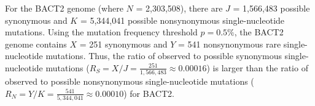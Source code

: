 For the BACT2 genome
(where $N$ = 2,303,508),
there are $J$ = 1,566,483 possible synonymous and
$K$ = 5,344,041 possible nonsynonymous single-nucleotide mutations.
%
Using the mutation frequency threshold $p = 0.5\%$,
the BACT2 genome contains
$X$ = 251 synonymous and
$Y$ = 541 nonsynonymous rare single-nucleotide mutations.
%
Thus, the ratio of observed to possible synonymous single-nucleotide mutations
($R_S = X / J = \frac{251}{1,566,483}
\approx 0.00016$)
is larger than the ratio of observed to possible nonsynonymous single-nucleotide mutations
($R_N = Y / K = \frac{541}{5,344,041}
\approx 0.00010$)
for BACT2.
\endinput